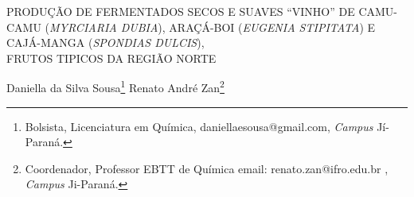 \documentclass[article,12pt,onesidea,4paper,english,brazil]{abntex2}
\begin{document}
	
	
	\frenchspacing 
	
	\begin{center}
		\LARGE PRODUÇÃO DE FERMENTADOS SECOS E SUAVES “VINHO” DE CAMU-CAMU
		(\MakeUppercase{\textit{Myrciaria dubia}}), ARAÇÁ-BOI (\MakeUppercase{\textit{Eugenia stipitata}}) E\\CAJÁ-MANGA (\MakeUppercase{\textit{Spondias dulcis}}),\\FRUTOS TIPICOS DA REGIÃO NORTE
		
		\normalsize
		Daniella da Silva Sousa\footnote{Bolsista, Licenciatura em Química, daniellaesousa@gmail.com, \textit{Campus} Jí-Paraná.} 
		Renato André Zan\footnote{Coordenador, Professor EBTT de Química email: renato.zan@ifro.edu.br , \textit{Campus} Ji-Paraná.} 
	\end{center}
	
\end{document}
